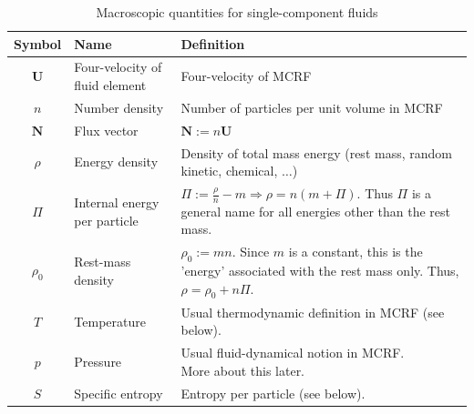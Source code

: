 \documentclass[12pt]{book}
\begin{document}
    \begin{table}[h]
    \centering
    \begin{tabular}{|c|l|l|}
    \hline
    \textbf{Symbol} & \textbf{Name} & \textbf{Definition} \\ \hline
    \(\mathbf{U}\) & \footnotesize Four-velocity of fluid element &\footnotesize Four-velocity of MCRF\par \\ \hline
    \(n\) & \footnotesize Number density &\footnotesize Number of particles per unit volume in MCRF \par \\ \hline
    \(\mathbf{N}\) &\footnotesize Flux vector &\footnotesize \(\mathbf{N} := n\mathbf{U}\) \\ \hline
    \(\rho\) &\footnotesize Energy density & \thead{\footnotesize Density of total mass energy \\(rest mass, random kinetic, chemical, $\dots$)}\\ \hline
    \(\Pi\) &\footnotesize Internal energy per particle &\thead{\footnotesize \(\Pi := \frac{\rho}{n} - m \Rightarrow \rho = n(m + \Pi)\). \\ Thus \(\Pi\) is a general name for all energies \\other than the rest mass.}\\ \hline
    \(\rho_0\) &\footnotesize Rest-mass density &\thead{\footnotesize \(\rho_0 := mn\). Since \(m\) is a constant,\\ this is the 'energy' associated with the rest mass only. \\Thus, \(\rho = \rho_0 + n\Pi\).}\\ \hline
    \(T\) &\footnotesize Temperature &\footnotesize Usual thermodynamic definition in MCRF (see below). \\ \hline
    \(p\) &\footnotesize Pressure & \thead{\footnotesize Usual fluid-dynamical notion in MCRF. \\More about this later.} \\ \hline
    \(S\) &\footnotesize Specific entropy &\footnotesize Entropy per particle (see below). \\ \hline
    \end{tabular}
    \caption{Macroscopic quantities for single-component fluids}
    \label{table 4.1}
    \end{table}
\end{document}
